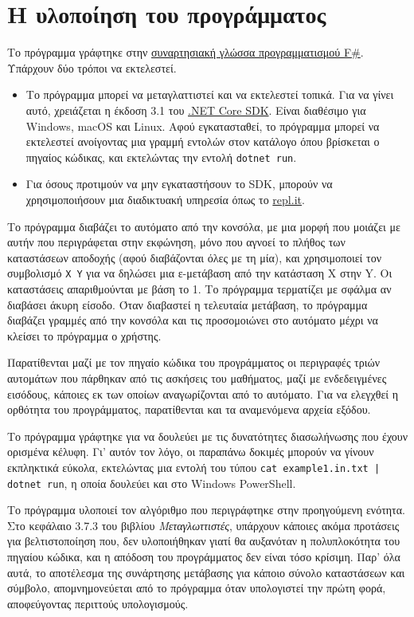 \documentclass{article}
\begin{document}
\section{Η υλοποίηση του προγράμματος}

Το πρόγραμμα γράφτηκε στην \href{https://fsharp.org}{συναρτησιακή γλώσσα προγραμματισμού F\#}. Υπάρχουν δύο τρόποι να εκτελεστεί.

\begin{itemize}
    \item Το πρόγραμμα μπορεί να μεταγλαττιστεί και να εκτελεστεί τοπικά. Για να γίνει αυτό, χρειάζεται η έκδοση 3.1 του \href{https://dotnet.microsoft.com/download}{.NET Core SDK}. Είναι διαθέσιμο για Windows, macOS και Linux. Αφού εγκατασταθεί, το πρόγραμμα μπορεί να εκτελεστεί ανοίγοντας μια γραμμή εντολών στον κατάλογο όπου βρίσκεται ο πηγαίος κώδικας, και εκτελώντας την εντολή \texttt{dotnet run}.
    \item Για όσους προτιμούν να μην εγκαταστήσουν το SDK, μπορούν να χρησιμοποιήσουν μια διαδικτυακή υπηρεσία όπως το \href{https://repl.it/languages/fsharp}{repl.it}.
\end{itemize}

Το πρόγραμμα διαβάζει το αυτόματο από την κονσόλα, με μια μορφή που μοιάζει με αυτήν που περιγράφεται στην εκφώνηση, μόνο που αγνοεί το πλήθος των καταστάσεων αποδοχής (αφού διαβάζονται όλες με τη μία), και χρησιμοποιεί τον συμβολισμό \texttt{X Y} για να δηλώσει μια ε-μετάβαση από την κατάσταση X στην Y. Οι καταστάσεις απαριθμούνται με βάση το 1. Το πρόγραμμα τερματίζει με σφάλμα αν διαβάσει άκυρη είσοδο. Όταν διαβαστεί η τελευταία μετάβαση, το πρόγραμμα διαβάζει γραμμές από την κονσόλα και τις προσομοιώνει στο αυτόματο μέχρι να κλείσει το πρόγραμμα ο χρήστης.

Παρατίθενται μαζί με τον πηγαίο κώδικα του προγράμματος οι περιγραφές τριών αυτομάτων που πάρθηκαν από τις ασκήσεις του μαθήματος, μαζί με ενδεδειγμένες εισόδους, κάποιες εκ των οποίων αναγωρίζονται από το αυτόματο. Για να ελεγχθεί η ορθότητα του προγράμματος, παρατίθενται και τα αναμενόμενα αρχεία εξόδου.

Το πρόγραμμα γράφτηκε για να δουλεύει με τις δυνατότητες διασωλήνωσης που έχουν ορισμένα κέλυφη. Γι' αυτόν τον λόγο, οι παραπάνω δοκιμές μπορούν να γίνουν εκπληκτικά εύκολα, εκτελώντας μια εντολή του τύπου \texttt{cat example1.in.txt | dotnet run}, η οποία δουλεύει και στο Windows PowerShell.

Το πρόγραμμα υλοποιεί τον αλγόριθμο που περιγράφτηκε στην προηγούμενη ενότητα. Στο κεφάλαιο 3.7.3 του βιβλίου \textit{Μεταγλωττιστές}, υπάρχουν κάποιες ακόμα προτάσεις για βελτιστοποίηση που, δεν υλοποιήθηκαν γιατί θα αυξανόταν η πολυπλοκότητα του πηγαίου κώδικα, και η απόδοση του προγράμματος δεν είναι τόσο κρίσιμη. Παρ' όλα αυτά, το αποτέλεσμα της συνάρτησης μετάβασης για κάποιο σύνολο καταστάσεων και σύμβολο, απομνημονεύεται από το πρόγραμμα όταν υπολογιστεί την πρώτη φορά, αποφεύγοντας περιττούς υπολογισμούς.
\end{document}
